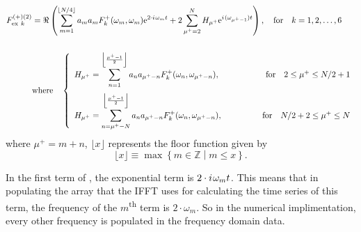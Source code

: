 \begin{align}
   {F_{\text{ex}~k}^{(+)(2)}} &= \Re 
      \left(
         \sum\limits_{m=1}^{\lfloor N/4 \rfloor}   a_m a_m F_k^{+}(\omega_m,\omega_m) \mathrm{e}^{2\cdot{i\mkern1.5mu}\omega_m t} +
         2 \sum\limits_{\mu^{+}=2}^{N} H_{\mu^{+}}\mathrm{e}^{{i\mkern1.5mu}(\omega_{\mu^{+}-1})t}
      \right)  ,\quad\text{for}\quad k=1,2,\ldots,6 \label{eq:SumQTF}\\[1.5em]
   &\text{where}\quad\left\{
   \begin{array}{lr}
      H_{\mu^{+}} = \displaystyle\sum\limits_{n=1}^{\left\lfloor\frac{\mu^{+}-1}{2}\right\rfloor}
               a_n a_{\mu^{+}-n} F_k^{+}(\omega_n,\omega_{\mu^{+}-n}),
         \qquad\qquad&\text{for}\quad 2\le \mu^{+}\le N/2+1
            \\[1.5em]
      H_{\mu^{+}} = \displaystyle\sum\limits_{n=\mu^{+}-N}^{\left\lfloor\frac{\mu^{+}-1}{2}\right\rfloor}
               a_n a_{\mu^{+}-n} F_k^{+}(\omega_n,\omega_{\mu^{+}-n}),
         \qquad\qquad&\text{for}\quad N/2+2\le\mu^{+}\le N
   \end{array}\right.
\end{align}
where $\mu^{+} = m + n$, $\lfloor x \rfloor$ represents the floor function given by
\begin{equation*}
   \lfloor x \rfloor \equiv \max \left\{ m \in \mathbb{Z} \middle| m\le x \right\}.
\end{equation*}


In the first term of , the exponential term is $2\cdot {i\mkern1.5mu} \omega_m t$.  This means that in populating the array that the IFFT uses for calculating the time series of this term, the frequency of the $m$\textsuperscript{th} term is $2 \cdot \omega_m$.  So in the numerical implimentation, every other frequency is populated in the frequency domain data.

